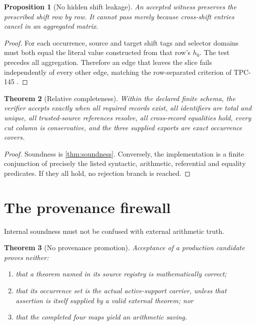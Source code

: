 \documentclass[11pt]{article}
\newtheorem{theorem}{Theorem}[section]
\newtheorem{proposition}[theorem]{Proposition}
\numberwithin{equation}{section}
\theoremstyle{definition}
\theoremstyle{remark}
\begin{document}
\begin{proposition}[No hidden shift leakage]
An accepted witness preserves the prescribed shift row by row.  It
cannot pass merely because cross-shift entries cancel in an
aggregated matrix.
\end{proposition}

\begin{proof}
For each occurrence, source and target shift tags and selector domains
must both equal the literal value constructed from that row's
\(h_0\).  The test precedes all aggregation.  Therefore an edge that
leaves the slice fails independently of every other edge, matching
the row-separated criterion of TPC-145
\citep{WangTPC145}.
\end{proof}

\begin{theorem}[Relative completeness]
Within the declared finite schema, the verifier accepts exactly when
all required records exist, all identifiers are total and unique, all
trusted-source references resolve, all cross-record equalities hold,
every cut column is conservative, and the three supplied exports are
exact occurrence covers.
\end{theorem}

\begin{proof}
Soundness is \cref{thm:soundness}.  Conversely, the implementation is
a finite conjunction of precisely the listed syntactic, arithmetic,
referential and equality predicates.  If they all hold, no rejection
branch is reached.
\end{proof}

\section{The provenance firewall}

Internal soundness must not be confused with external arithmetic
truth.

\begin{theorem}[No provenance promotion]
\label{thm:firewall}
Acceptance of a production candidate proves neither:
\begin{enumerate}[label=(\roman*),leftmargin=2em]
\item that a theorem named in its source registry is mathematically
  correct;
\item that its occurrence set is the actual active-support carrier,
  unless that assertion is itself supplied by a valid external
  theorem; nor
\item that the completed four maps yield an arithmetic saving.
\end{enumerate}
\end{theorem}
\end{document}
